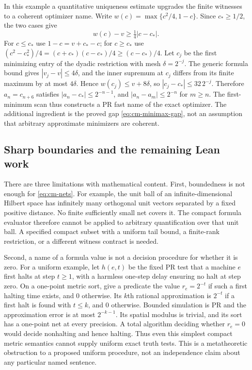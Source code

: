 In this example a quantitative uniqueness estimate upgrades the finite
witnesses to a coherent optimizer name.  Write
$w(c)=\max\{c^2/4,1-c\}$.  Since $c_*\geq1/2$, the two cases give
\[
                 w(c)-v\geq\tfrac14|c-c_*|.
\tag{M7}\label{eq:cm-minimax-gap}
\]
For $c\leq c_*$ use $1-c=v+c_*-c$; for $c\geq c_*$ use
$(c^2-c_*^2)/4=(c+c_*)(c-c_*)/4\geq(c-c_*)/4$.
Let $c_j$ be the first minimizing entry of the dyadic restriction with mesh
$\delta=2^{-j}$.  The generic formula bound gives $|v_j-v|\leq4\delta$,
and the inner supremum at $c_j$ differs from its finite maximum by at most
$4\delta$.  Hence $w(c_j)\leq v+8\delta$, so
$|c_j-c_*|\leq32\,2^{-j}$.  Therefore $a_n=c_{n+6}$ satisfies
$|a_n-c_*|\leq2^{-n-1}$, and
$|a_n-a_m|\leq2^{-n}$ for $m\geq n$.
The first-minimum scan thus constructs a PR fast name of the exact optimizer.
The additional ingredient is the proved gap \eqref{eq:cm-minimax-gap}, not
an assumption that arbitrary approximate minimizers are coherent.

\subsection{Sharp boundaries and the remaining Lean work}

There are three limitations with mathematical content.
First, boundedness is not enough for \eqref{eq:cm-nets}.  For example, the unit
ball of an infinite-dimensional Hilbert space has infinitely many orthogonal
unit vectors separated by a fixed positive distance.  No finite sufficiently
small net covers it.  The compact formula evaluator therefore cannot be
applied to arbitrary quantification over that unit ball.  A specified compact
subset with a uniform tail bound, a finite-rank restriction, or a different
witness contract is needed.

Second, a name of a formula value is not a decision procedure for whether it
is zero.  For a uniform example, let $h(e,t)$ be the fixed PR test that a
machine $e$ first halts at step $t\geq1$, with a harmless one-step delay
ensuring no halt at step zero.  On a one-point metric sort, give a predicate
the value $r_e=2^{-t}$ if such a first halting time exists, and $0$ otherwise.
Its $k$th rational approximation is $2^{-t}$ if a first halt is found with
$t\leq k$, and $0$ otherwise.  Bounded simulation is PR and the approximation
error is at most $2^{-k-1}$.  Its spatial modulus is trivial, and its sort has
a one-point net at every precision.  A total algorithm deciding whether
$r_e=0$ would decide nonhalting and hence halting.  Thus even this simplest
compact metric semantics cannot supply uniform exact truth tests.  This is a
metatheoretic obstruction to a proposed uniform procedure, not an
independence claim about any particular named sentence.


